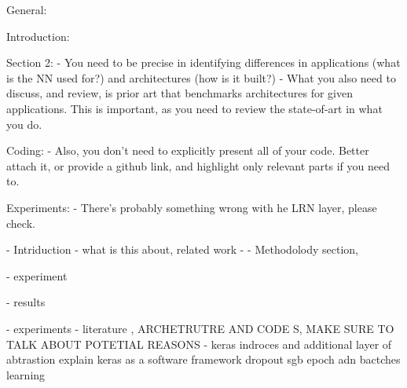 General:

Introduction:

Section 2:
-	You need to be precise in identifying differences in applications (what is the NN used for?) and architectures (how is it built?)
-	What you also need to discuss, and review, is prior art that benchmarks architectures for given applications. This is important, as you need to review the state-of-art in what you do.

Coding:
-	Also, you don’t need to explicitly present all of your code. Better attach it, or provide a github link, and highlight only relevant parts if you need to.

Experiments:
-	There’s probably something wrong with he LRN layer, please check.



- Intriduction - what is this about, related work
-
- Methodolody section,

- experiment

- results

- experiments
- literature , ARCHETRUTRE AND CODE S, MAKE SURE TO TALK ABOUT POTETIAL REASONS
- keras indroces and additional layer of abtrastion
explain  keras as a software framework
dropout
sgb epoch adn bactches
learning


